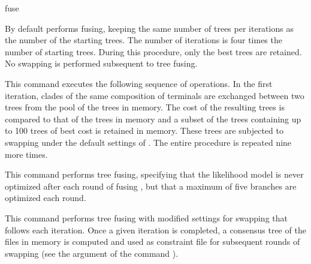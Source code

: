 \begin{command}{fuse}{}
\begin{arguments}
    \end{arguments}
    
        {By default \poy performs fusing, keeping the same number of trees per
        iterations as the number of the starting trees. The number of iterations is
        four times the number of starting trees. During this procedure, only the best
        trees are retained. No swapping is performed subsequent to tree fusing.}
        
    \begin{poyexamples}
    
            {This command executes the following sequence of operations. In the
            first iteration, clades of the same composition of terminals are exchanged
            between two trees from the pool of the trees in memory. The cost of the
            resulting trees is compared to that of the trees in memory and a subset of
            the trees containing up to 100 trees of best cost is retained in memory.
            These trees are subjected to swapping under the default settings of
            . The entire procedure is repeated nine more times.}
            
            {This command performs tree fusing, specifying that the likelihood model is never optimized 
            after each round of fusing , but that a maximum of five branches are optimized
            each round.}
            
            {This command performs tree fusing  with modified settings for swapping
            that follows each iteration. Once a given iteration is completed, a
            consensus tree of the files in memory is computed and used as constraint
            file for subsequent rounds of swapping (see the argument
             of the command ).}    

     \end{poyexamples}
        
    \begin{poyalso}
    \end{poyalso}

\end{command}




